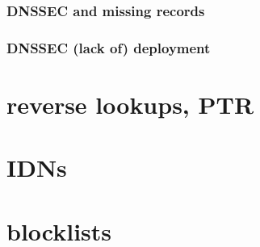 \subsubsection{DNSSEC and missing records}


\subsubsection{DNSSEC (lack of) deployment}


\section{reverse lookups, PTR}


\section{IDNs}


\section{blocklists}


